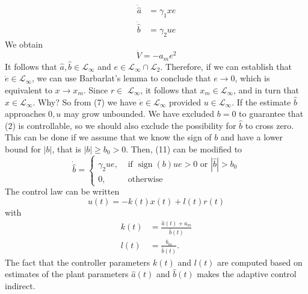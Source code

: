 \documentclass[10pt]{article}
\begin{document}
\begin{multicols*}{2}
\begin{equation*}
    \begin{split}
        \dot{\hat{a}} &= \gamma_1 x e \\
        \dot{\hat{b}} &= \gamma_2 u e
    \end{split}
\end{equation*}
We obtain
\begin{equation*}
    \dot V = -a_m e ^2
\end{equation*}
It follows that $\hat{a}, \hat{b} \in \mathcal{L}_{\infty}$ and $e \in \mathcal{L}_{\infty} \cap \mathcal{L}_2$. Therefore, if we can establish that $\dot{e} \in \mathcal{L}_{\infty}$, we can use Barbarlat's lemma to conclude that $e \rightarrow 0$, which is equivalent to $x \rightarrow x_m$. Since $r \in$ $\mathcal{L}_{\infty}$, it follows that $x_m \in \mathcal{L}_{\infty}$, and in turn that $x \in \mathcal{L}_{\infty}$. Why? So from (7) we have $\dot{e} \in \mathcal{L}_{\infty}$ provided $u \in \mathcal{L}_{\infty}$.  If the estimate $\hat{b}$ approaches $0, u$ may grow unbounded. We have excluded $b=0$ to guarantee that (2) is controllable, so we should also exclude the possibility for $\hat{b}$ to cross zero. This can be done if we assume that we know the sign of $b$ and have a lower bound for $|b|$, that is $|b| \geq b_0>0$. Then, (11) can be modified to
$$
\dot{\hat{b}}= \begin{cases}\gamma_2 u e, & \text { if } \operatorname{sign}(b) u e>0 \text { or }|\hat{b}|>b_0 \\ 0, & \text { otherwise }\end{cases}
$$
The control law can be written
$$
u(t)=-k(t) x(t)+l(t) r(t)
$$
with
$$
\begin{aligned}
k(t) & =\frac{\hat{a}(t)+a_m}{\hat{b}(t)} \\
l(t) & =\frac{b_m}{\hat{b}(t)} .
\end{aligned}
$$
The fact that the controller parameters $k(t)$ and $l(t)$ are computed based on estimates of the plant parameters $\hat{a}(t)$ and $\hat{b}(t)$ makes the adaptive control indirect.

\end{multicols*}
\end{document}
